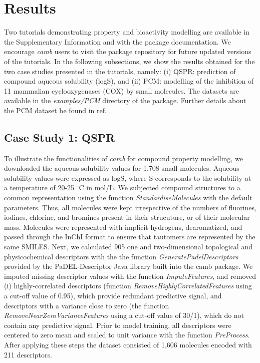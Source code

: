 \documentclass[twoside,a4wide,10pt]{article}
\begin{document}
\section*{Results}
Two tutorials demonstrating property and bioactivity modelling are available in the Supplementary Information
and with the package documentation.
We encourage {\it camb} users to visit the package repository %
for future updated versions of the tutorials.
In the following subsections, we show the results obtained for the two case studies 
presented in the tutorials, namely:
(i) QSPR: prediction of compound aqueous solubility (logS),
and (ii) PCM:
modelling of the inhibition of 11 mammalian cyclooxygenases (COX) by small molecules.
The datasets are available in the {\it examples/PCM} directory of the package.
Further details about the PCM dataset be found in ref. \citep{cortesCOX}.

\subsection{Case Study 1: QSPR}

To illustrate the functionalities of {\it camb} for compound property modelling,
we downloaded the aqueous solubility values for 1,708 small molecules.
Aqueous solubility values were expressed as logS, where S corresponds to the solubility at a temperature of 20-25 $^{\circ}$C in mol/L.
We subjected compound structures to a common representation using the function 
{\it StandardiseMolecules} with the default parameters.
Thus, all molecules were kept irrespective of the numbers of fluorines, iodines, chlorine, and bromines
present in their strucuture, or of their molecular mass.
Molecules were represented with implicit hydrogens, dearomatized, 
and passed through the InChI format to ensure that tautomers are represented by the same SMILES. %
Next, we calculated 905 one and two-dimensional topological and
physicochemical descriptors with the the function {\it GeneratePadelDescriptors}
provided by the PaDEL-Descriptor \citep{padel} Java library built into the camb package.
We imputed missing descriptor values with the function {\it ImputeFeatures},
and removed (i) highly-correlated descriptors (function {\it RemoveHighlyCorrelatedFeatures} using a cut-off value of 0.95), 
which provide redundant predictive signal, 
and descriptors with a variance close to zero (the function {\it RemoveNearZeroVarianceFeatures} using a cut-off value of 30/1),
which do not contain any predictive signal.
Prior to model training, all descriptors were centered to zero mean and scaled to unit variance
with the function {\it PreProcess}.
After applying these steps the dataset consisted of 1,606 molecules
encoded with 211 descriptors.\\
\end{document}

